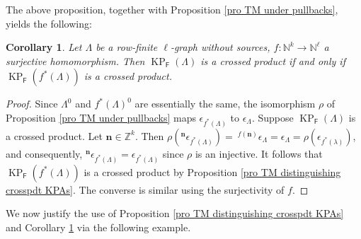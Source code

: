 \documentclass[a4paper,reqno,12pt]{amsart}
\numberwithin{equation}{section}
\newtheorem{cor}[thm]{Corollary}
\theoremstyle{definition}
\theoremstyle{remark}
\newcommand{\KP}{\operatorname{KP}}
\newcommand{\N}{\mathbf{n}}
\begin{document}
The above proposition, together with Proposition \ref{pro TM under pullbacks}, yields the following:
\begin{cor}\label{cor pullback preserves crosspdt}
Let $\Lambda$ be a row-finite $\ell$-graph without sources, $f:\mathbb{N}^k\longrightarrow \mathbb{N}^\ell$ a surjective homomorphism. Then $\KP_\mathsf{F}(\Lambda)$ is a crossed product if and only if $\KP_\mathsf{F}(f^*(\Lambda))$ is a crossed product.   
\end{cor}
\begin{proof}
Since $\Lambda^0$ and $f^*(\Lambda)^0$ are essentially the same, the isomorphism $\rho$ of Proposition \ref{pro TM under pullbacks} maps $\epsilon_{f^*(\Lambda)}$ to $\epsilon_\Lambda$. Suppose $\KP_\mathsf{F}(\Lambda)$ is a crossed product. Let $\N\in \mathbb{Z}^k$. Then $\rho(^\N \epsilon_{f^*(\Lambda)})=~^{f(\N)}\epsilon_\Lambda=\epsilon_\Lambda=\rho(\epsilon_{f^*(\lambda)})$, and consequently, $^\N \epsilon_{f^*(\Lambda)}=\epsilon_{f^*(\Lambda)}$ since $\rho$ is an injective. It follows that $\KP_\mathsf{F}(f^*(\Lambda))$ is a crossed product by Proposition \ref{pro TM distinguishing crosspdt KPAs}. The converse is similar using the surjectivity of $f$.    
\end{proof}
We now justify the use of Proposition \ref{pro TM distinguishing crosspdt KPAs} and Corollary \ref{cor pullback preserves crosspdt} via the following example. 
\end{document}
